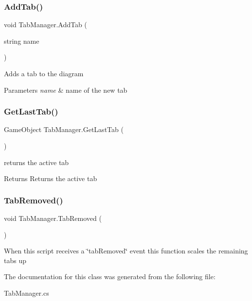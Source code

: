\subsubsection{\texorpdfstring{Add\+Tab()}{AddTab()}}
{\footnotesize\ttfamily void Tab\+Manager.\+Add\+Tab (\begin{DoxyParamCaption}\item[{string}]{name }\end{DoxyParamCaption})}



Adds a tab to the diagram 


\begin{DoxyParams}{Parameters}
{\em name} & name of the new tab\\
\hline
\end{DoxyParams}
\mbox{\label{class_tab_manager_a98d132c5a132278fad057a17463f0000}} 
\subsubsection{\texorpdfstring{Get\+Last\+Tab()}{GetLastTab()}}
{\footnotesize\ttfamily Game\+Object Tab\+Manager.\+Get\+Last\+Tab (\begin{DoxyParamCaption}{ }\end{DoxyParamCaption})}



returns the active tab 

\begin{DoxyReturn}{Returns}
Returns the active tab
\end{DoxyReturn}
\mbox{\label{class_tab_manager_a060b949fab08f226d44b0daa86e5c424}} 
\subsubsection{\texorpdfstring{Tab\+Removed()}{TabRemoved()}}
{\footnotesize\ttfamily void Tab\+Manager.\+Tab\+Removed (\begin{DoxyParamCaption}{ }\end{DoxyParamCaption})}



When this script receives a \char`\"{}tab\+Removed\char`\"{} event this function scales the remaining tabs up 



The documentation for this class was generated from the following file\+:\begin{DoxyCompactItemize}
\item 
Tab\+Manager.\+cs\end{DoxyCompactItemize}
